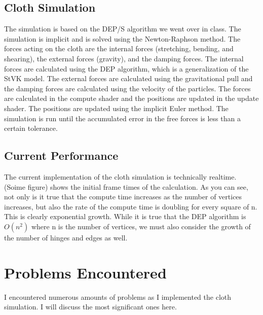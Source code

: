 \documentclass[letterpaper, 10 pt, conference]{ieeeconf}  %
\begin{document}
\subsection{Cloth Simulation}
The simulation is based on the DEP/S algorithm we went over in class. The simulation is implicit and is solved using the Newton-Raphson method. The forces acting on the cloth are the internal forces (stretching, bending, and shearing), the external forces (gravity), and the damping forces. The internal forces are calculated using the DEP algorithm, which is a generalization of the StVK model. The external forces are calculated using the gravitational pull and the damping forces are calculated using the velocity of the particles. The forces are calculated in the compute shader and the positions are updated in the update shader. The positions are updated using the implicit Euler method. The simulation is run until the accumulated error in the free forces is less than a certain tolerance.

\subsection{Current Performance}
The current implementation of the cloth simulation is technically realtime. (Soime figure) shows the initial frame times of the calculation. As you can see, not only is it true that the compute time increases as the number of vertices increases, but also the rate of the compute time is doubling for every square of n. This is clearly exponential growth. While it is true that the DEP algorithm is $O(n^2)$ where n is the number of vertices, we must also consider the growth of the number of hinges and edges as well. 





\section{Problems Encountered}
        I encountered numerous amounts of problems as I implemented the cloth simulation. I will discuss the most significant ones here.
\end{document}
